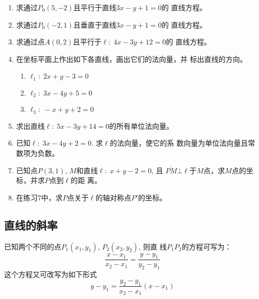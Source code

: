 \begin{ex}
\begin{enumerate}
    \item 求通过$P_0(5,-2)$且平行于直线$3x-y+1=0$的
    直线方程。
    \item 求通过$P_0(-2,1)$且垂直于直线$3x-y+1=0$的
    直线方程。
    \item 求通过点$A(0,2)$且平行于$\ell:\; 4x-3y+12=0$的
    直线方程。
    \item 在坐标平面上作出如下各直线，画出它们的法向量，并
    标出直线的方向。
\begin{enumerate}
    \item $\ell_1:\; 2x+y-3=0$
    \item $\ell_2:\; 3x-4y+5=0$
    \item $\ell_3:\; -x+y+2=0$
\end{enumerate}
    \item 求出直线$\ell:\; 5x-3y+14=0$的所有单位法向量。
    \item 已知$\ell:\; 3x-4y+2=0$. 求$\ell$的法向量，使它的系
    数向量为单位法向量且常数项为负数。
    \item 已知点$P(3,1)$, $M$和直线$\ell:\; x+y-2=0$, 且
    $\overline{PM}\bot \ell$于$M$点，求$M$点的坐标，并求$P$点到$\ell$的距
    离。
    \item 在练习7中，求$P$点关于$\ell$的轴对称点$P'$的坐标。
\end{enumerate}
\end{ex}

\subsection{直线的斜率}

已知两个不同的点$P_1(x_1,y_1)$, $P_2(x_2,y_2)$, 则直
线$P_1P_2$的方程可写为：
\[\frac{x-x_1}{x_2-x_1}=\frac{y-y_1}{y_2-y_1}\]
这个方程又可改写为如下形式
\[y-y_1=\frac{y_2-y_1}{x_2-x_1}(x-x_1)\]

\begin{figure}[htp]
    \centering
{}
    \caption{}
\end{figure}


